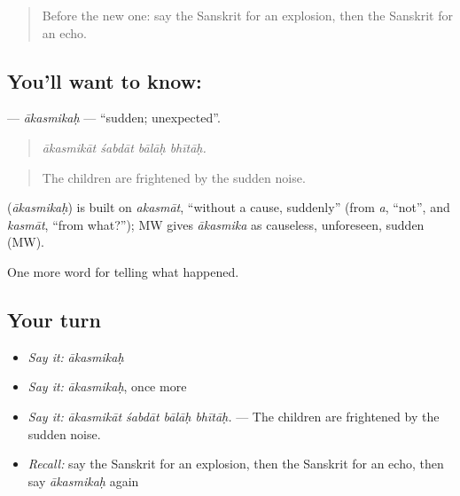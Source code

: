 \begin{quote}
Before the new one: say the Sanskrit for an explosion, then the Sanskrit for an echo.
\end{quote}

\subsection*{You'll want to know: }
\textbf{} — \emph{ākasmikaḥ} — \textquotedblleft{}sudden; unexpected\textquotedblright{}.

\begin{quote}
   
\end{quote}

\begin{quote}
\emph{ākasmikāt śabdāt bālāḥ bhītāḥ.}
\end{quote}

\begin{quote}
The children are frightened by the sudden noise.
\end{quote}

\begin{cousinweb}
\textbf{} (\emph{ākasmikaḥ}) is built on \emph{akasmāt}, \textquotedblleft{}without a cause, suddenly\textquotedblright{} (from \emph{a}, \textquotedblleft{}not\textquotedblright{}, and \emph{kasmāt}, \textquotedblleft{}from what?\textquotedblright{}); MW gives \emph{ākasmika} as causeless, unforeseen, sudden (MW).
\end{cousinweb}

\begin{grammarlens}[title={What you've built}]
One more word for telling what happened.
\end{grammarlens}

\subsection*{Your turn}
\begin{itemize}
\raggedright
  \item \emph{Say it:} \emph{ākasmikaḥ}
  \item \emph{Say it:} \emph{ākasmikaḥ}, once more
  \item \emph{Say it:} \emph{ākasmikāt śabdāt bālāḥ bhītāḥ.} — The children are frightened by the sudden noise.
  \item \emph{Recall:} say the Sanskrit for an explosion, then the Sanskrit for an echo, then say \emph{ākasmikaḥ} again
\end{itemize}

